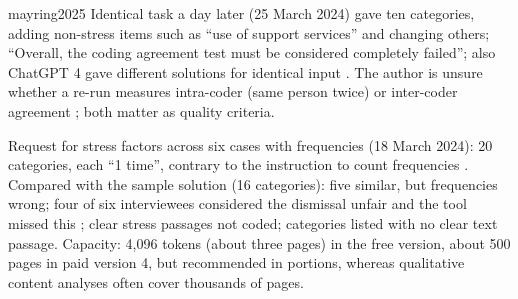 \begin{papercard}{mayring2025}
 Identical task a day later (25 March 2024) gave ten categories, adding non-stress items such as ``use of support services'' and changing others; ``Overall, the coding agreement test must be considered completely failed''; also ChatGPT 4 gave different solutions for identical input . The author is unsure whether a re-run measures intra-coder (same person twice) or inter-coder agreement ; both matter as quality criteria.

 Request for stress factors across six cases with frequencies (18 March 2024): 20 categories, each ``1 time'', contrary to the instruction to count frequencies . Compared with the sample solution (16 categories): five similar, but frequencies wrong; four of six interviewees considered the dismissal unfair and the tool missed this ; clear stress passages not coded; categories listed with no clear text passage. Capacity: 4,096 tokens (about three pages) in the free version, about 500 pages in paid version 4, but recommended in portions, whereas qualitative content analyses often cover thousands of pages.


\end{papercard}
